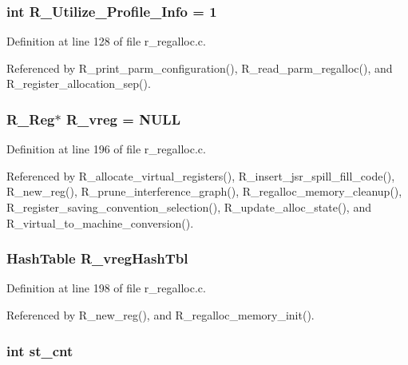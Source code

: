 \subsubsection{\setlength{\rightskip}{0pt plus 5cm}int \bf{R\_\-Utilize\_\-Profile\_\-Info} = 1}\label{r__regalloc_8c_cb42be9fdd1b603eb7b714df20afc9ae}




Definition at line 128 of file r\_\-regalloc.c.

Referenced by R\_\-print\_\-parm\_\-configuration(), R\_\-read\_\-parm\_\-regalloc(), and R\_\-register\_\-allocation\_\-sep().
\subsubsection{\setlength{\rightskip}{0pt plus 5cm}\bf{R\_\-Reg}$\ast$ \bf{R\_\-vreg} = \bf{NULL}}\label{r__regalloc_8c_2dbcf950358669643eac003e20df4a6f}




Definition at line 196 of file r\_\-regalloc.c.

Referenced by R\_\-allocate\_\-virtual\_\-registers(), R\_\-insert\_\-jsr\_\-spill\_\-fill\_\-code(), R\_\-new\_\-reg(), R\_\-prune\_\-interference\_\-graph(), R\_\-regalloc\_\-memory\_\-cleanup(), R\_\-register\_\-saving\_\-convention\_\-selection(), R\_\-update\_\-alloc\_\-state(), and R\_\-virtual\_\-to\_\-machine\_\-conversion().
\subsubsection{\setlength{\rightskip}{0pt plus 5cm}\bf{Hash\-Table} \bf{R\_\-vreg\-Hash\-Tbl}}\label{r__regalloc_8c_5af1440b54ff2374201da593736f163c}




Definition at line 198 of file r\_\-regalloc.c.

Referenced by R\_\-new\_\-reg(), and R\_\-regalloc\_\-memory\_\-init().
\subsubsection{\setlength{\rightskip}{0pt plus 5cm}int \bf{st\_\-cnt}}\label{r__regalloc_8c_2e851ea165e823befccbe6bee6d064f2}




